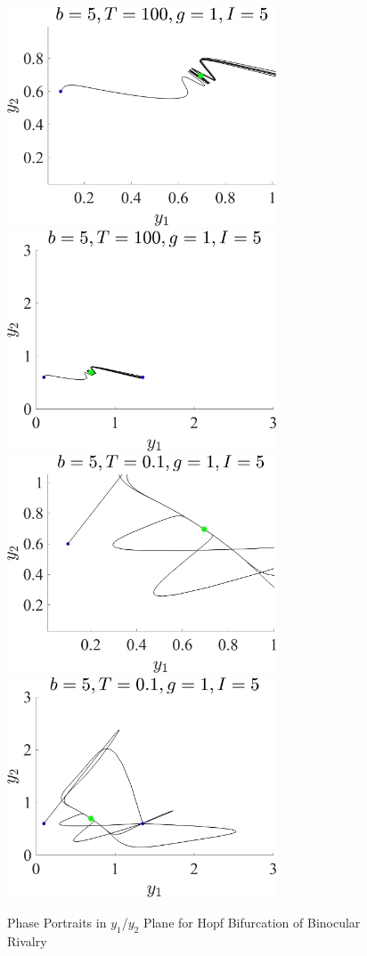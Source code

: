 \documentclass[11pt]{article}
\begin{document}
\begin{figure}[h]
\centering
\includegraphics[width=8cm]{ys_HopfNeurons_b_5_T100_g1I_5_2.png}
\includegraphics[width=8cm]{ys_HopfNeurons_b_5_T100_g1I_5.png}
\includegraphics[width=8cm]{ys_HopfNeurons_b_5_T0.1_g1I_5_2.png}
\includegraphics[width=8cm]{ys_HopfNeurons_b_5_T0.1_g1I_5.png}
\caption{Phase Portraits in $y_1$/$y_2$ Plane for Hopf Bifurcation of Binocular Rivalry}
\end{figure}
\end{document}
